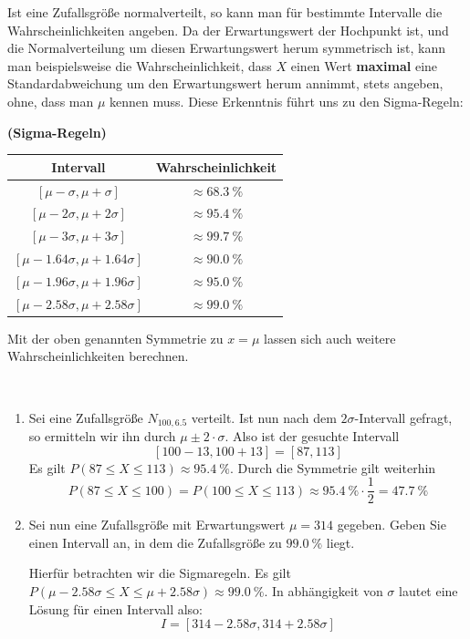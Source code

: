 \documentclass[ngerman, 12pt]{nssheetxea}
\begin{document}
Ist eine Zufallsgröße normalverteilt, so kann man für bestimmte Intervalle die Wahrscheinlichkeiten angeben. Da der Erwartungswert der Hochpunkt ist, und die Normalverteilung um diesen Erwartungswert herum symmetrisch ist, kann man beispielsweise die Wahrscheinlichkeit, dass $X$ einen Wert \textbf{maximal} eine Standardabweichung um den Erwartungswert herum annimmt, stets angeben, ohne, dass man $\mu$ kennen muss. Diese Erkenntnis führt uns zu den Sigma-Regeln:

\begin{theorem} \textbf{(Sigma-Regeln)} \par
\renewcommand{\arraystretch}{1.3}
\begin{center}
\begin{tabular}{c c}
\toprule
Intervall & Wahrscheinlichkeit \\
\midrule
$[\mu-\sigma, \mu + \sigma]$ & $\approx \SI{68,3}{\percent}$ \\
$[\mu-2\sigma, \mu + 2\sigma]$ & $\approx \SI{95,4}{\percent}$ \\
$[\mu-3\sigma, \mu + 3\sigma]$ & $\approx \SI{99,7}{\percent}$ \\
\midrule
$[\mu- \num{1,64} \sigma, \mu + \num{1,64} \sigma]$ & $\approx \SI{90,0}{\percent}$ \\
$[\mu- \num{1,96} \sigma, \mu + \num{1,96} \sigma]$ & $\approx \SI{95,0}{\percent}$ \\
$[\mu- \num{2,58} \sigma, \mu + \num{2,58} \sigma]$ & $\approx \SI{99,0}{\percent}$ \\
\bottomrule
\end{tabular}
\end{center}
\renewcommand{\arraystretch}{1}	
\end{theorem}

Mit der oben genannten Symmetrie zu $x=\mu$ lassen sich auch weitere Wahrscheinlichkeiten berechnen.

\begin{example} \ 
\begin{enumerate}
\item Sei eine Zufallsgröße $N_{100, \num{6,5}}$ verteilt. Ist nun nach dem $2\sigma$-Intervall gefragt, so ermitteln wir ihn durch $\mu \pm 2\cdot \sigma$. Also ist der gesuchte Intervall 
\[ [100-13, 100+13] = [87,113]  \]
Es gilt $P(87\leq X \leq 113) \approx \SI{95,4}{\percent}$. Durch die Symmetrie gilt weiterhin
\[ P(87 \leq X \leq 100) = P(100 \leq X \leq 113) \approx \SI{95,4}{\percent} \cdot \dfrac{1}{2} = \SI{47,7}{\percent}  \]

\item Sei nun eine Zufallsgröße mit Erwartungswert $\mu=314$ gegeben. Geben Sie einen Intervall an, in dem die Zufallsgröße zu $\SI{99,0}{\percent}$ liegt. \par
Hierfür betrachten wir die Sigmaregeln. Es gilt $P(\mu - \num{2,58} \sigma \leq X \leq \mu + \num{2,58} \sigma) \approx \SI{99,0}{\percent}$. In abhängigkeit von $\sigma$ lautet eine Lösung für einen Intervall also:
\[ I=[314-\num{2,58}\sigma, 314+\num{2,58}\sigma]\]
\end{enumerate}
\end{example}
\end{document}
